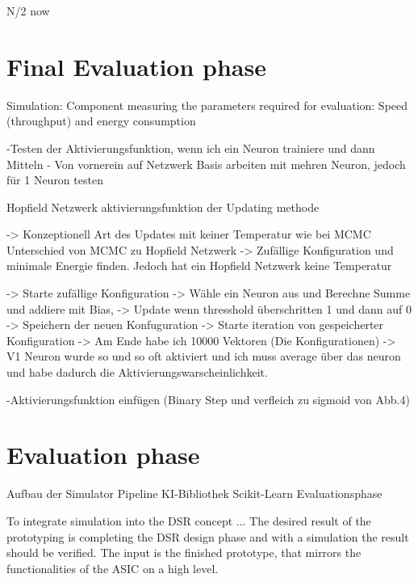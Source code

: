 N/2 now


\section{Final Evaluation phase}

Simulation: Component measuring the parameters required for evaluation: Speed (throughput) and energy consumption


-Testen der Aktivierungsfunktion, wenn ich ein Neuron trainiere und dann Mitteln 
- Von vornerein auf Netzwerk Basis arbeiten mit mehren Neuron, jedoch für 1 Neuron testen



Hopfield Netzwerk aktivierungsfunktion der Updating methode

-> Konzeptionell Art des Updates mit keiner Temperatur wie bei MCMC 
Unterschied von MCMC zu Hopfield Netzwerk -> Zufällige Konfiguration und minimale Energie finden. Jedoch hat ein Hopfield
Netzwerk keine Temperatur 

-> Starte zufällige Konfiguration
-> Wähle ein Neuron aus und Berechne Summe und addiere mit Bias, 
-> Update wenn thresshold überschritten 1 und dann auf 0 
-> Speichern der neuen Konfuguration 
-> Starte iteration von gespeicherter Konfiguration 
-> Am Ende habe ich 10000 Vektoren (Die Konfigurationen) -> V1 Neuron wurde so und so oft aktiviert und ich muss average
über das neuron und habe dadurch die Aktivierungswarscheinlichkeit.

-Aktivierungsfunktion einfügen (Binary Step und verfleich zu sigmoid von Abb.4)



\section{Evaluation phase}

Aufbau der Simulator Pipeline
KI-Bibliothek Scikit-Learn
Evaluationsphase

To integrate simulation into the DSR concept ... 
The desired result of the prototyping is completing the \ac{DSR} design phase and with a simulation the result should be verified.
The input is the finished prototype, that mirrors the functionalities of the \ac{ASIC} on a high level.
